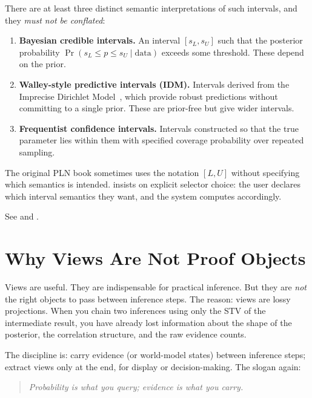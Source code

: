 \documentclass[11pt,openany]{report}
\begin{document}
There are at least three distinct semantic interpretations of such
intervals, and they \emph{must not be conflated}:

\begin{enumerate}
\item \textbf{Bayesian credible intervals.}  An interval
  $[s_L, s_U]$ such that the posterior probability
  $\Pr(s_L \le p \le s_U \mid \text{data})$ exceeds some threshold.
  These depend on the prior.

\item \textbf{Walley-style predictive intervals (IDM).}  Intervals
  derived from the Imprecise Dirichlet Model~\cite{Walley1991,Walley1996BagOfMarbles},
  which provide robust predictions without committing to a single prior.
  These are prior-free but give wider intervals.

\item \textbf{Frequentist confidence intervals.}  Intervals constructed
  so that the true parameter lies within them with specified coverage
  probability over repeated sampling.
\end{enumerate}

The original PLN book sometimes uses the notation $[L, U]$ without
specifying which semantics is intended.  \xiPLN{} insists on explicit
selector choice: the user declares which interval semantics they want,
and the system computes accordingly.

See  and
.

\section{Why Views Are Not Proof Objects}

Views are useful.  They are indispensable for practical inference.  But
they are \emph{not} the right objects to pass between inference steps.
The reason: views are lossy projections.  When you chain two inferences
using only the STV of the intermediate result, you have already lost
information about the shape of the posterior, the correlation structure,
and the raw evidence counts.

The \xiPLN{} discipline is: carry evidence (or world-model states)
between inference steps; extract views only at the end, for display
or decision-making.  The slogan again:

\begin{quote}
\emph{Probability is what you query; evidence is what you carry.}
\end{quote}
\end{document}
